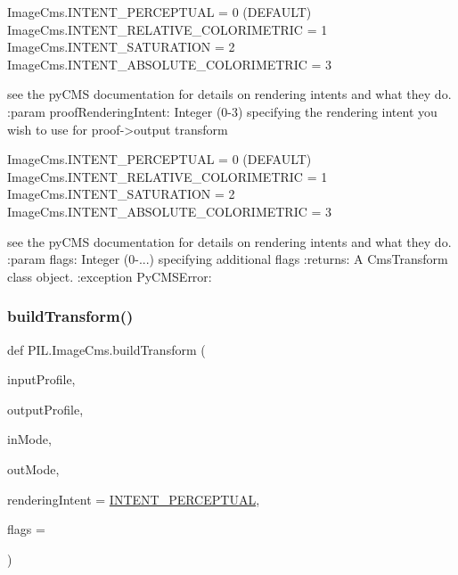 \begin{DoxyVerb}
        ImageCms.INTENT_PERCEPTUAL            = 0 (DEFAULT)
        ImageCms.INTENT_RELATIVE_COLORIMETRIC = 1
        ImageCms.INTENT_SATURATION            = 2
        ImageCms.INTENT_ABSOLUTE_COLORIMETRIC = 3

    see the pyCMS documentation for details on rendering intents and what
    they do.
:param proofRenderingIntent: Integer (0-3) specifying the rendering intent
    you wish to use for proof->output transform

        ImageCms.INTENT_PERCEPTUAL            = 0 (DEFAULT)
        ImageCms.INTENT_RELATIVE_COLORIMETRIC = 1
        ImageCms.INTENT_SATURATION            = 2
        ImageCms.INTENT_ABSOLUTE_COLORIMETRIC = 3

    see the pyCMS documentation for details on rendering intents and what
    they do.
:param flags: Integer (0-...) specifying additional flags
:returns: A CmsTransform class object.
:exception PyCMSError:
\end{DoxyVerb}
 \mbox{\label{namespacePIL_1_1ImageCms_aa7114c26c0427783c135404ce73d28e7}} 
\subsubsection{\texorpdfstring{build\+Transform()}{buildTransform()}}
{\footnotesize\ttfamily def P\+I\+L.\+Image\+Cms.\+build\+Transform (\begin{DoxyParamCaption}\item[{}]{input\+Profile,  }\item[{}]{output\+Profile,  }\item[{}]{in\+Mode,  }\item[{}]{out\+Mode,  }\item[{}]{rendering\+Intent = {\ttfamily \hyperlink{namespacePIL_1_1ImageCms_a5ede11c95f67c7ea71b86e9a9e8a4f87}{I\+N\+T\+E\+N\+T\+\_\+\+P\+E\+R\+C\+E\+P\+T\+U\+AL}},  }\item[{}]{flags = {} }\end{DoxyParamCaption})}

